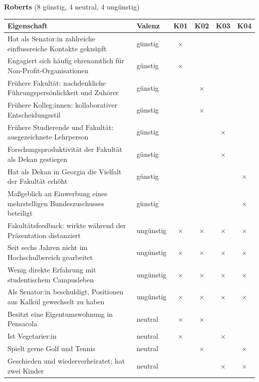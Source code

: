 \clearpage
\noindent\textbf{Roberts} (8 günstig, 4 neutral, 4 ungünstig)
\begin{center}
  \setlength{\tabcolsep}{4pt}
  \begin{tabular}{@{}p{}lcccc@{}}
    \toprule
    Eigenschaft & Valenz & K01 & K02 & K03 & K04 \\
    \midrule
    Hat als Senator:in zahlreiche einflussreiche Kontakte geknüpft
    & günstig & $\times$ &  &  &  \\
    Engagiert sich häufig ehrenamtlich für Non-Profit-Organisationen
    & günstig & $\times$ &  &  &  \\
    Frühere Fakultät: nachdenkliche Führungspersönlichkeit und Zuhörer
    & günstig &  & $\times$ &  &  \\
    Frühere Kolleg:innen: kollaborativer Entscheidungsstil
    & günstig &  & $\times$ &  &  \\
    Frühere Studierende und Fakultät: ausgezeichnete Lehrperson
    & günstig &  &  & $\times$ &  \\
    Forschungsproduktivität der Fakultät als Dekan gestiegen
    & günstig &  &  & $\times$ &  \\
    Hat als Dekan in Georgia die Vielfalt der Fakultät erhöht
    & günstig &  &  &  & $\times$ \\
    Maßgeblich an Einwerbung eines mehrstelligen Bundeszuschusses beteiligt
    & günstig &  &  &  & $\times$ \\
    \midrule
    Fakultätsfeedback: wirkte während der Präsentation distanziert
    & ungünstig & $\times$ & $\times$ & $\times$ & $\times$ \\
    Seit sechs Jahren nicht im Hochschulbereich gearbeitet
    & ungünstig & $\times$ & $\times$ & $\times$ & $\times$ \\
    Wenig direkte Erfahrung mit studentischem Campusleben
    & ungünstig & $\times$ & $\times$ & $\times$ & $\times$ \\
    Als Senator:in beschuldigt, Positionen aus Kalkül gewechselt zu haben
    & ungünstig & $\times$ & $\times$ & $\times$ & $\times$ \\
    \midrule
    Besitzt eine Eigentumswohnung in Pensacola
    & neutral & $\times$ & $\times$ &  &  \\
    Ist Vegetarier:in
    & neutral & $\times$ &  & $\times$ &  \\
    Spielt gerne Golf und Tennis
    & neutral &  & $\times$ &  & $\times$ \\
    Geschieden und wiederverheiratet; hat zwei Kinder
    & neutral &  &  & $\times$ & $\times$ \\
    \bottomrule
  \end{tabular}
\end{center}

